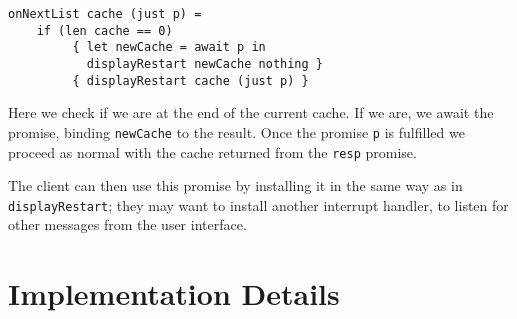 \documentclass[msc,deptreport,cs]{infthesis} %
\newcommand{\code}[1]{\lstinline{#1}}
\newcommand\aeff{{\AE}ff\xspace}
\begin{document}
\begin{lstlisting}
onNextList cache (just p) =
    if (len cache == 0)
         { let newCache = await p in
           displayRestart newCache nothing }
         { displayRestart cache (just p) }
\end{lstlisting}

\noindent Here we check if we are at the end of the current cache. If we are, we
await the promise, binding \code{newCache} to the result. Once the promise
\code{p} is fulfilled we proceed as normal with the cache returned from the
\code{resp} promise.

The client can then use this promise by installing it in the same way as in
\code{displayRestart}; they may want to install another interrupt handler, to
listen for other messages from the user interface.

\section{Implementation Details}



\end{document}
